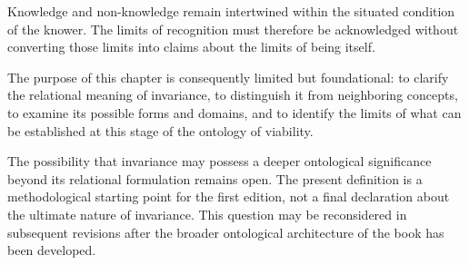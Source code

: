 Knowledge and non-knowledge remain intertwined within the
situated condition of the knower. The limits of recognition
must therefore be acknowledged without converting those
limits into claims about the limits of being itself.

The purpose of this chapter is consequently limited but
foundational: to clarify the relational meaning of invariance,
to distinguish it from neighboring concepts, to examine its
possible forms and domains, and to identify the limits of
what can be established at this stage of the ontology of
viability.

The possibility that invariance may possess a deeper
ontological significance beyond its relational formulation
remains open. The present definition is a methodological
starting point for the first edition, not a final declaration
about the ultimate nature of invariance. This question may
be reconsidered in subsequent revisions after the broader
ontological architecture of the book has been developed.














